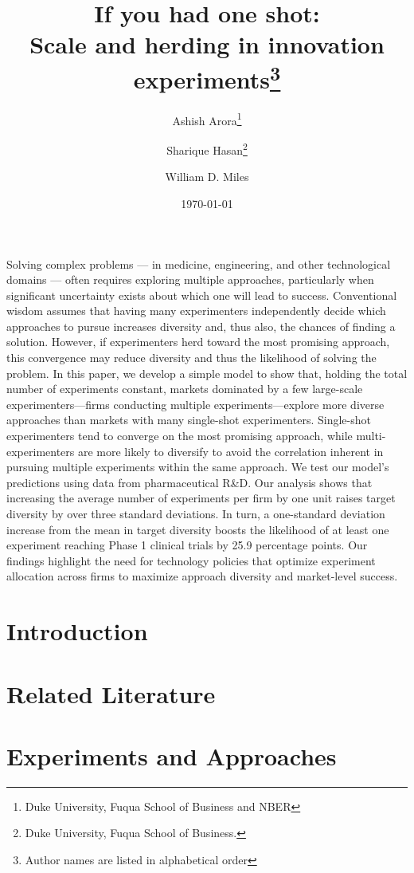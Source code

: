 \documentclass[12pt,letterpaper]{article}
\title{If you had one shot: \\ Scale and herding in innovation experiments\thanks{Author names are listed in alphabetical order}}
\author{Ashish Arora\thanks{Duke University, Fuqua School of Business and NBER} \and Sharique Hasan\thanks{Duke University, Fuqua School of Business.} \and William D. Miles\footnotemark[2]}
\date{\today}
\begin{document}
\maketitle

\abstract

Solving complex problems --- in medicine, engineering, and other technological domains --- often requires exploring multiple approaches, particularly when significant uncertainty exists about which one will lead to success. Conventional wisdom assumes that having many experimenters independently decide which approaches to pursue increases diversity and, thus also, the chances of finding a solution. However, if experimenters herd toward the most promising approach, this convergence may reduce diversity and thus the likelihood of solving the problem. In this paper, we develop a simple model to show that, holding the total number of experiments constant, markets dominated by a few large-scale experimenters---firms conducting multiple experiments---explore more diverse approaches than markets with many single-shot experimenters. Single-shot experimenters tend to converge on the most promising approach, while multi-experimenters are more likely to diversify to avoid the correlation inherent in pursuing multiple experiments within the same approach. We test our model's predictions using data from pharmaceutical R\&D.   Our analysis shows that increasing the average number of experiments per firm by one unit raises target diversity by over three standard deviations. In turn, a one-standard deviation increase from the mean in target diversity boosts the likelihood of at least one experiment reaching Phase 1 clinical trials by 25.9 percentage points. Our findings highlight the need for technology policies that optimize experiment allocation across firms to maximize approach diversity and market-level success.

\newpage
\doublespacing

\section{Introduction}


\section{Related Literature}


\section{Experiments and Approaches}

\end{document}
